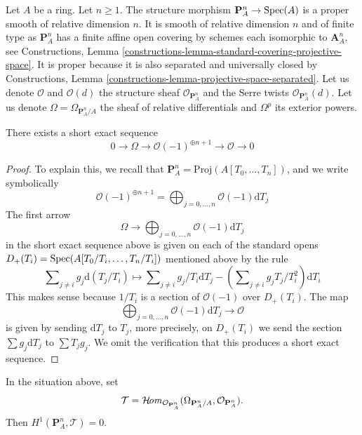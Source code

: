 \noindent
Let $A$ be a ring. Let $n \geq 1$. The structure morphism
$\mathbf{P}^n_A \to \mathop{\mathrm{Spec}}(A)$ is a proper smooth of relative
dimension $n$. It is smooth of relative dimension $n$ and of finite type
as $\mathbf{P}^n_A$ has a finite affine open covering by schemes each
isomorphic to $\mathbf{A}^n_A$, see Constructions, Lemma
\ref{constructions-lemma-standard-covering-projective-space}.
It is proper because it is also separated and universally closed
by Constructions, Lemma \ref{constructions-lemma-projective-space-separated}.
Let us denote $\mathcal{O}$ and $\mathcal{O}(d)$ the structure sheaf
$\mathcal{O}_{\mathbf{P}^n_A}$ and the Serre twists
$\mathcal{O}_{\mathbf{P}^n_A}(d)$.
Let us denote $\Omega = \Omega_{\mathbf{P}^n_A/A}$ the sheaf
of relative differentials and $\Omega^p$ its exterior powers.

\begin{lemma}
\label{lemma-euler-sequence}
There exists a short exact sequence
$$
0 \to \Omega \to \mathcal{O}(-1)^{\oplus n + 1} \to \mathcal{O} \to 0
$$
\end{lemma}

\begin{proof}
To explain this, we recall that
$\mathbf{P}^n_A = \text{Proj}(A[T_0, \ldots, T_n])$,
and we write symbolically
$$
\mathcal{O}(-1)^{\oplus n + 1} =
\bigoplus\nolimits_{j = 0, \ldots, n} \mathcal{O}(-1) \text{d}T_j
$$
The first arrow
$$
\Omega \to
\bigoplus\nolimits_{j = 0, \ldots, n} \mathcal{O}(-1) \text{d}T_j
$$
in the short exact sequence above
is given on each of the standard opens
$D_+(T_i) = \mathop{\mathrm{Spec}}(A[T_0/T_i, \ldots, T_n/T_i])$
mentioned above by the rule
$$
\sum\nolimits_{j \not = i} g_j \text{d}(T_j/T_i)
\longmapsto
\sum\nolimits_{j \not = i} g_j/T_i \text{d}T_j
- (\sum\nolimits_{j \not = i} g_jT_j/T_i^2) \text{d}T_i
$$
This makes sense because $1/T_i$ is a section of $\mathcal{O}(-1)$
over $D_+(T_i)$. The map
$$
\bigoplus\nolimits_{j = 0, \ldots, n} \mathcal{O}(-1) \text{d}T_j
\to
\mathcal{O}
$$
is given by sending $\text{d}T_j$ to $T_j$, more precisely, on
$D_+(T_i)$ we send the section $\sum g_j \text{d}T_j$ to
$\sum T_jg_j$. We omit the verification that this produces
a short exact sequence.
\end{proof}

\begin{lemma}
\label{lemma-H1-tangent-projective-space}
In the situation above, set
$$
\mathcal{T} =
\mathop{\mathcal{H}\!\mathit{om}}\nolimits_{\mathcal{O}_{\mathbf{P}^n_A}}
(\Omega_{\mathbf{P}^n_A/A}, \mathcal{O}_{\mathbf{P}^n_A}).
$$
Then $H^1(\mathbf{P}^n_A, \mathcal{T}) = 0$.
\end{lemma}

